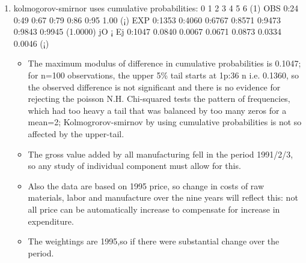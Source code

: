 \documentclass[a4paper,12pt]{article}
\begin{document}
\begin{enumerate}
\item kolmogorov-smirnor uses cumulative probabilities:
0 1 2 3 4 5 6 (1)
OBS 0:24 0:49 0:67 0:79 0:86 0:95 1.00 (¡)
EXP 0:1353 0:4060 0:6767 0:8571 0:9473 0:9843 0:9945 (1.0000)
jO ¡ Ej 0:1047 0.0840 0.0067 0.0671 0.0873 0.0334 0.0046 (¡)
\begin{itemize}
    \item The maximum modulus of difference in cumulative probabilities is 0.1047; for n=100
observations, the upper 5\% tail starts at 1p:36
n i.e. 0.1360, so the observed difference is
not significant and there is no evidence for rejecting the poisson N.H. Chi-squared tests
the pattern of frequencies, which had too heavy a tail that was balanced by too many
zeros for a mean=2; Kolmogrorov-smirnov by using cumulative probabilities is not so
affected by the upper-tail.
\item The gross value added by all manufacturing fell in the period 1991/2/3, so any study
of individual component must allow for this. 
\item Also the data are based on 1995 price, so
change in costs of raw materials, labor and manufacture over the nine years will reflect
this: not all price can be automatically increase to compensate for increase in expenditure.
\item The weightings are 1995,so if there were substantial change over the period.
\end{itemize}
 
\end{enumerate}
\end{document}
